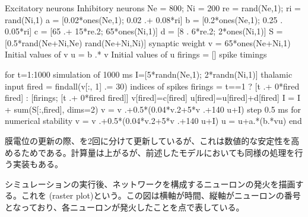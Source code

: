 \documentclass[letterpaper,10pt,english]{sphinxmanual}
\begin{document}
\begin{sphinxVerbatim}[commandchars=\\\{\}]
\PYGZsh{} Excitatory neurons    Inhibitory neurons
Ne = 800;               Ni = 200
re = rand(Ne,1);        ri = rand(Ni,1)
a = [0.02*ones(Ne,1);   0.02 .+ 0.08*ri]
b = [0.2*ones(Ne,1);    0.25 .\PYGZhy{} 0.05*ri]
c = [\PYGZhy{}65 .+ 15*re.\PYGZca{}2;   \PYGZhy{}65*ones(Ni,1)]
d = [8 .\PYGZhy{} 6*re.\PYGZca{}2;      2*ones(Ni,1)]
S = [0.5*rand(Ne+Ni,Ne) \PYGZhy{}rand(Ne+Ni,Ni)] \PYGZsh{} synaptic weight
v = \PYGZhy{}65*ones(Ne+Ni,1)   \PYGZsh{} Initial values of v
u = b .* v              \PYGZsh{} Initial values of u
firings = []            \PYGZsh{} spike timings

for t=1:1000 \PYGZsh{} simulation of 1000 ms
    I=[5*randn(Ne,1); 2*randn(Ni,1)] \PYGZsh{} thalamic input
    fired = findall(v[:, 1] .\PYGZgt{}= 30) \PYGZsh{} indices of spikes
    firings = t==1 ? [t .+ 0*fired fired] : [firings; [t .+ 0*fired fired]]
    v[fired]=c[fired]
    u[fired]=u[fired]+d[fired]
    I = I + sum(S[:,fired], dims=2)
    v = v .+0.5*(0.04*v.\PYGZca{}2+5*v .+140 \PYGZhy{}u+I) \PYGZsh{} step 0.5 ms for numerical stability
    v = v .+0.5*(0.04*v.\PYGZca{}2+5*v .+140 \PYGZhy{}u+I) 
    u = u+a.*(b.*v\PYGZhy{}u)
end
\end{sphinxVerbatim}

膜電位の更新の際、を2回に分けて更新しているが、これは数値的な安定性を高めるためである。計算量は上がるが、前述したモデルにおいても同様の処理を行う実装もある。

シミュレーションの実行後、ネットワークを構成するニューロンの発火を描画する。これを (raster plot)という。この図は横軸が時間、縦軸がニューロンの番号となっており、各ニューロンが発火したことを点で表している。

\begin{sphinxVerbatim}[commandchars=\\\{\}]
\PYG{p}{[}\PYG{p}{]} \PYG{p}{[}\PYG{p}{]}   
          
\end{sphinxVerbatim}
\end{document}
